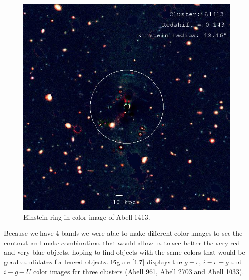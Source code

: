 \begin{figure}[H]
\centering
\includegraphics[width=15cm]{images/A1413_ring.jpg}
\caption[Einstein ring in color image of A1413]{Einstein ring in color image of Abell 1413.}
\end{figure}

Because we have 4 bands we were able to make different color images to see the contrast and make combinations that would allow us to see better the very red and very blue objects, hoping to find objects with the same colors that would be good candidates for lensed objects. Figure [4.7] displays the $g-r$, $i-r-g$ and $i-g-U$ color images for three clusters (Abell 961, Abell 2703 and Abell 1033). 

